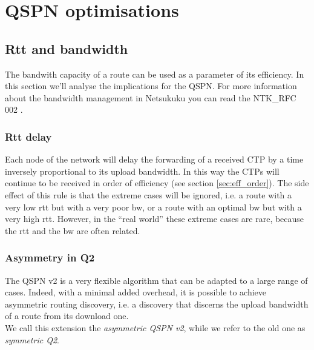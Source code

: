 \documentclass[a4paper]{article}
\begin{document}
\section{QSPN optimisations}
\subsection{Rtt and bandwidth}
\label{sec:bandwidth_q1q2}

The bandwith capacity of a route can be used as a parameter of its
efficiency. In this section we'll analyse the implications for the QSPN.
For more information about the bandwidth management in Netsukuku you can read
the NTK\_RFC 002 \cite{ntkrfc0002}.

\subsubsection{Rtt delay}
\label{sec:rtt_delay}

Each node of the network will delay the forwarding of a received CTP by a time
inversely proportional to its upload bandwidth. In this way the CTPs will
continue to be received in order of efficiency (see section
\ref{sec:eff_order}).
The side effect of this rule is that the extreme cases will be ignored, i.e. a
route with a very low rtt but with a very poor bw, or a route with an optimal
bw but with a very high rtt. However, in the ``real world'' these extreme
cases are rare, because the rtt and the bw are often related.

\subsubsection{Asymmetry in Q2}
The QSPN v2 is a very flexible algorithm that can be adapted to a large range
of cases. Indeed, with a minimal added overhead, it is possible to achieve
asymmetric routing discovery, i.e. a discovery that discerns the upload
bandwidth of a route from its download one.\\
We call this extension the \emph{asymmetric QSPN v2}, while we refer to the
old one as \emph{symmetric Q2}.
\end{document}
